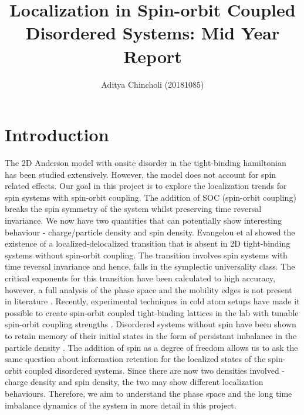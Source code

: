 \documentclass[twocolumn]{article}
\title{Localization in Spin-orbit Coupled Disordered Systems: Mid Year Report}
\author{Aditya Chincholi (20181085)}
\begin{document}
\maketitle

\section{Introduction}

The 2D Anderson model with onsite disorder in the
tight-binding hamiltonian has been studied extensively.
However, the model does not account for spin related
effects. Our goal in this project is to explore the
localization trends for spin systems with spin-orbit
coupling. The addition of SOC (spin-orbit coupling) breaks
the spin symmetry of the system whilst preserving time
reversal invariance. We now have two quantities that can
potentially show interesting behaviour - charge/particle
density and spin density. Evangelou et al
\cite{evangelouAndersonTransitionTwo1987} showed the
existence of a localized-delocalized transition that is
absent in 2D tight-binding systems without spin-orbit
coupling. The transition involves spin systems with time
reversal invariance and hence, falls in the symplectic
universality class. The critical exponents for this
transition have been calculated to high accuracy, however, a
full analysis of the phase space and the mobility edges is
not present in literature
\cite{asadaAndersonTransitionTwoDimensional2002}. Recently,
experimental techniques in cold atom setups have made it
possible to create spin-orbit coupled tight-binding lattices
in the lab with tunable spin-orbit coupling strengths
\cite{orsoAndersonTransitionCold2017,huangExperimentalRealizationTwodimensional2016}.
Disordered systems without spin have been shown to retain
memory of their initial states in the form of persistant
imbalance in the particle density
\cite{chakrabortyMemoriesInitialStates2020}. The addition of
spin as a degree of freedom allows us to ask the same
question about information retention for the localized
states of the spin-orbit coupled disordered systems. Since
there are now two densities involved - charge density and
spin density, the two may show different localization
behaviours. Therefore, we aim to understand the phase space
and the long time imbalance dynamics of the system in more
detail in this project. 
\end{document}
